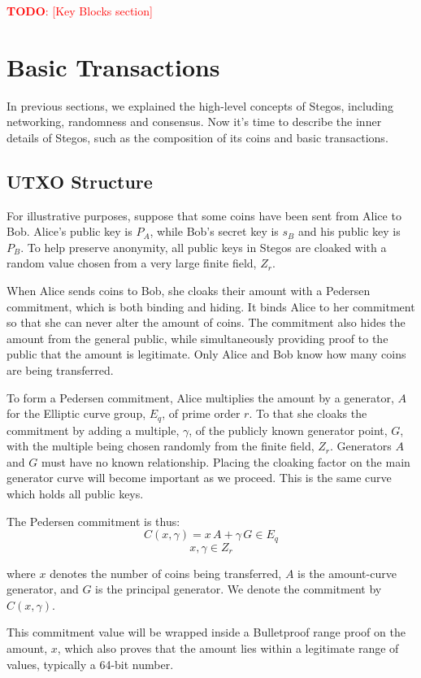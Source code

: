 \documentclass[a4paper, 10pt, conference]{ieeeconf}
\newcommand\todo[1]{\textcolor{red}{\textbf{TODO}: [#1]}}
\begin{document}
\todo{Key Blocks section}

\section{Basic Transactions}\label{transactions}

In previous sections, we explained the high-level concepts of Stegos, including networking, randomness and consensus. Now it's time to describe the inner details of Stegos, such as the composition of its coins and basic transactions.

\subsection{UTXO Structure}

For illustrative purposes, suppose that some coins have been sent from Alice to Bob. Alice's public key is $P_A$, while Bob's secret key is $s_B$ and his public key is $P_B$. To help preserve anonymity, all public keys in Stegos are cloaked with a random value chosen from a very large finite field, $Z_r$.

When Alice sends coins to Bob, she cloaks their amount with a Pedersen commitment, which is both binding and hiding. It binds Alice to her commitment so that she can never alter the amount of coins. The commitment also hides the amount from the general public, while simultaneously providing proof to the public that the amount is legitimate.  Only Alice and Bob know how many coins are being transferred. 

To form a Pedersen commitment, Alice multiplies the amount by a generator, $A$ for the Elliptic curve group, $E_q$, of prime order $r$. To that she cloaks the commitment by adding a multiple, $\gamma$, of the publicly known generator point, $G$, with the multiple being chosen randomly from the finite field, $Z_r$. Generators $A$ and $G$ must have no known relationship. Placing the cloaking factor on the main generator curve will become important as we proceed. This is the same curve which holds all public keys. 

The Pedersen commitment is thus:
$$ C(x, \gamma) = x \, A + \gamma \, G \in E_q$$
$$x, \gamma \in Z_r$$

where $x$ denotes the number of coins being transferred, $A$ is the amount-curve generator, and $G$ is the principal generator. We denote the commitment by $C(x, \gamma)$. 

This commitment value will be wrapped inside a Bulletproof range proof on the amount, $x$, which also proves that the amount lies within a legitimate range of values, typically a 64-bit number.
\end{document}
